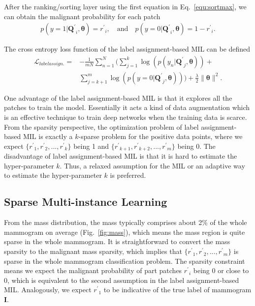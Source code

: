 \documentclass[runningheads,a4paper]{llncs}
\begin{document}
After the ranking/sorting layer using the first equation in Eq.~\ref{equ:sortmax}, we can obtain the malignant probability for each patch
\begin{equation}
\label{equ:ppatch}
\begin{aligned}
p(y=1 | {\bm{Q}^\prime}_i, \bm{\theta}) = {r^\prime}_i, \quad\text{and}\quad p(y=0 | {\bm{Q}^\prime}_i, \bm{\theta}) = 1-{r^\prime}_i.
\end{aligned}
\end{equation}

The cross entropy loss function of the label assignment-based MIL can be defined
\begin{equation}
\label{equ:weightedlabelloss}
\begin{aligned}
\mathcal{L}_{labelassign.} = &-\frac{1}{mN}\sum_{n=1}^{N}  \bigg ( \sum_{j=1}^{k} {\log(p(y_n | {\bm{Q}^\prime}_j, \bm{\theta}))}+ \\&\sum_{j=k+1}^{m} {\log(p(y=0 | {\bm{Q}^\prime}_j, \bm{\theta}))}\bigg )+\frac{\lambda}{2} \|\bm{\theta}\|^2.
\end{aligned}
\end{equation}

One advantage of the label assignment-based MIL is that it explores all the patches to train the model. Essentially it acts a kind of data augmentation which is an effective technique to train deep networks when the training data is scarce. From the sparsity perspective, the optimization problem of label assignment-based MIL is exactly a $k$-sparse problem for the positive data points, where we expect $\{{r^\prime}_1, {r^\prime}_2, ..., {r^\prime}_k\}$ being 1 and $\{{r^\prime}_{k+1}, {r^\prime}_{k+2}, ..., {r^\prime}_m\}$ being 0. The disadvantage of label assignment-based MIL is that it is hard to estimate the hyper-parameter $k$. Thus, a relaxed assumption for the MIL or an adaptive way to estimate the hyper-parameter $k$ is preferred. %
\subsection{Sparse Multi-instance Learning}\label{sec:sparse}
From the mass distribution, the mass typically comprises about 2\% of the whole mammogram on average (Fig.~\ref{fig:mass}), which means the mass region is quite sparse in the whole mammogram. It is straightforward to convert the mass sparsity to the malignant mass sparsity, which implies that $\{{r^\prime}_1, {r^\prime}_2, ..., {r^\prime}_m\}$ is sparse in the whole mammogram classification problem. The sparsity constraint means we expect the malignant probability of part patches ${r^ \prime}_i$ being 0 or close to 0, which is equivalent to the second assumption in the label assignment-based MIL. Analogously, we expect ${r^\prime}_1$ to be indicative of the true label of mammogram $\bm{I}$.
\end{document}
